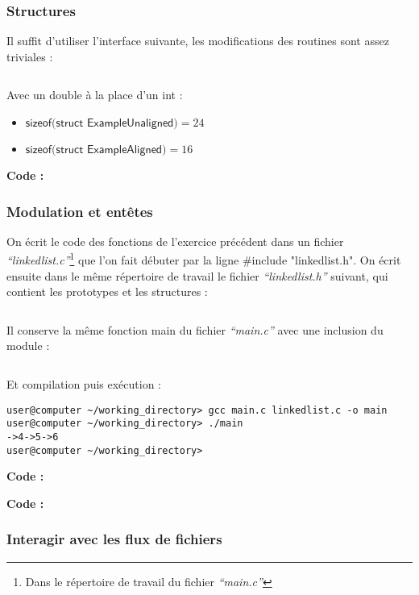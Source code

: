\documentclass[../main.tex]{subfiles}
\begin{document}
\subsubsection{Structures}
 \newline
Il suffit d'utiliser l'interface suivante, les modifications des routines sont assez triviales :
\inputminted{c}{solutions/part2/chapter2/matrix.h}
Avec un \textsf{double} à la place d'un \textsf{int} :
\begin{itemize}
	\item $\textsf{sizeof(struct ExampleUnaligned)} = 24$
	\item $\textsf{sizeof(struct ExampleAligned)} = 16$
\end{itemize}

\textbf{Code :} 
\subsubsection{Modulation et entêtes}
 \newline
On écrit le code des fonctions de l'exercice précédent dans un fichier \textit{``linkedlist.c''}\footnote{Dans le répertoire de travail du fichier \textit{``main.c''}} que l'on fait débuter par la ligne \textsf{\#include "linkedlist.h"}. On écrit ensuite dans le même répertoire de travail le fichier \textit{``linkedlist.h''} suivant, qui contient les prototypes et les structures :
\inputminted{c}{solutions/part2/chapter2/linkedlist_2.h}
Il conserve la même fonction \textsf{main} du fichier \textit{``main.c''} avec une inclusion du module :
\inputminted{c}{solutions/part2/chapter2/linkedlist_2.c}
Et compilation puis exécution :
\begin{verbatim}
user@computer ~/working_directory> gcc main.c linkedlist.c -o main
user@computer ~/working_directory> ./main
->4->5->6
user@computer ~/working_directory>
\end{verbatim}

\textbf{Code :} 


\textbf{Code :} 
\subsubsection{Interagir avec les flux de fichiers}
\end{document}
